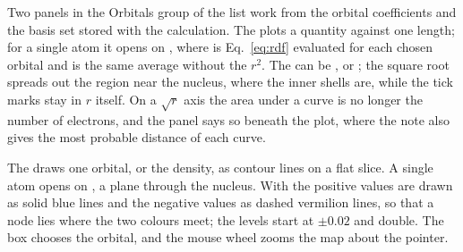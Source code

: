 Two panels in the Orbitals group of the  list work from the orbital coefficients and the basis set stored with the calculation. The  plots a quantity against one length; for a single atom it opens on , where  is Eq.~\eqref{eq:rdf} evaluated for each chosen orbital and  is the same average without the $r^2$.
The  can be ,  or ; the square root spreads out the region near the nucleus, where the inner shells are, while the tick marks stay in $r$ itself.
On a $\sqrt{r}$ axis the area under a curve is no longer the number of electrons, and the panel says so beneath the plot, where the note also gives the most probable distance of each curve.

The  draws one orbital, or the density, as contour lines on a flat slice. A single atom opens on , a plane through the nucleus. With  the positive values are drawn as solid blue lines and the negative values as dashed vermilion lines, so that a node lies where the two colours meet; the levels start at $\pm 0.02$ and double.
The  box chooses the orbital, and the mouse wheel zooms the map about the pointer.

